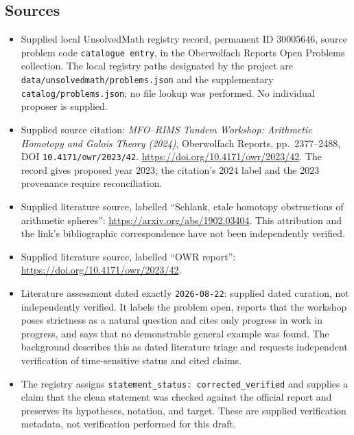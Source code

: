 \documentclass[11pt]{article}
\begin{document}
\subsection{Sources}
\begin{itemize}
\item Supplied local UnsolvedMath registry record, permanent ID \(30005646\), source problem code \texttt{catalogue entry}, in the Oberwolfach Reports Open Problems collection. The local registry paths designated by the project are \texttt{data/unsolvedmath/problems.json} and the supplementary \texttt{catalog/problems.json}; no file lookup was performed. No individual proposer is supplied.
\item Supplied source citation: \emph{MFO--RIMS Tandem Workshop: Arithmetic Homotopy and Galois Theory (2024)}, Oberwolfach Reports, pp.\ 2377--2488, DOI \texttt{10.4171/owr/2023/42}. \url{https://doi.org/10.4171/owr/2023/42}. The record gives proposed year \(2023\); the citation's \(2024\) label and the \(2023\) provenance require reconciliation.
\item Supplied literature source, labelled ``Schlank, etale homotopy obstructions of arithmetic spheres'': \url{https://arxiv.org/abs/1902.03404}. This attribution and the link's bibliographic correspondence have not been independently verified.
\item Supplied literature source, labelled ``OWR report'': \url{https://doi.org/10.4171/owr/2023/42}.
\item Literature assessment dated exactly \texttt{2026-08-22}: supplied dated curation, not independently verified. It labels the problem open, reports that the workshop poses strictness as a natural question and cites only progress in work in progress, and says that no demonstrable general example was found. The background describes this as dated literature triage and requests independent verification of time-sensitive status and cited claims.
\item The registry assigns \texttt{statement\_status: corrected\_verified} and supplies a claim that the clean statement was checked against the official report and preserves its hypotheses, notation, and target. These are supplied verification metadata, not verification performed for this draft.
\end{itemize}
\end{document}
